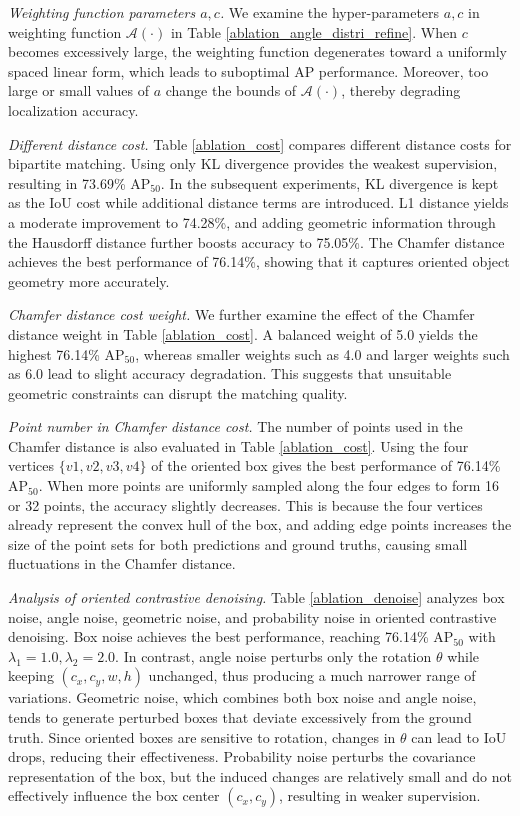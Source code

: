 \documentclass[lettersize,journal]{IEEEtran}
\begin{document}
\textit{Weighting function parameters $a,c$.} We examine the hyper-parameters $a,c$ in weighting function $\mathcal{A}(\cdot)$ in Table \ref{ablation_angle_distri_refine}. When $c$ becomes excessively large, the weighting function degenerates toward a uniformly spaced linear form, which leads to suboptimal AP performance. Moreover, too large or small values of $a$ change the bounds of $\mathcal{A}(\cdot)$, thereby degrading localization accuracy.

\textit{Different distance cost.}
Table \ref{ablation_cost} compares different distance costs for bipartite matching. Using only KL divergence provides the weakest supervision, resulting in 73.69\% AP$_{50}$. In the subsequent experiments, KL divergence is kept as the IoU cost while additional distance terms are introduced. L1 distance yields a moderate improvement to 74.28\%, and adding geometric information through the Hausdorff distance further boosts accuracy to 75.05\%. The Chamfer distance achieves the best performance of 76.14\%, showing that it captures oriented object geometry more accurately.

\textit{Chamfer distance cost weight.}
We further examine the effect of the Chamfer distance weight in Table \ref{ablation_cost}. A balanced weight of 5.0 yields the highest 76.14\% AP$_{50}$, whereas smaller weights such as 4.0 and larger weights such as 6.0 lead to slight accuracy degradation. This suggests that unsuitable geometric constraints can disrupt the matching quality.


\visualContrastiveDenoise

\AblationDenoise


\textit{Point number in Chamfer distance cost.}
The number of points used in the Chamfer distance is also evaluated in Table \ref{ablation_cost}. Using the four vertices $\{v1,v2,v3,v4\}$ of the oriented box gives the best performance of 76.14\% AP$_{50}$. When more points are uniformly sampled along the four edges to form 16 or 32 points, the accuracy slightly decreases. This is because the four vertices already represent the convex hull of the box, and adding edge points increases the size of the point sets for both predictions and ground truths, causing small fluctuations in the Chamfer distance.


\textit{Analysis of oriented contrastive denoising.}
Table \ref{ablation_denoise} analyzes box noise, angle noise, geometric noise, and probability noise in oriented contrastive denoising. 
Box noise achieves the best performance, reaching 76.14\% AP$_{50}$ with $\lambda_1=1.0, \lambda_2=2.0$. 
In contrast, angle noise perturbs only the rotation $\theta$ while keeping $(c_x,c_y,w,h)$ unchanged, thus producing a much narrower range of variations.
Geometric noise, which combines both box noise and angle noise, tends to generate perturbed boxes that deviate excessively from the ground truth. Since oriented boxes are sensitive to rotation, changes in $\theta$ can lead to IoU drops, reducing their effectiveness.
Probability noise perturbs the covariance representation of the box, but the induced changes are relatively small and do not effectively influence the box center $(c_x,c_y)$, resulting in weaker supervision.
\end{document}

